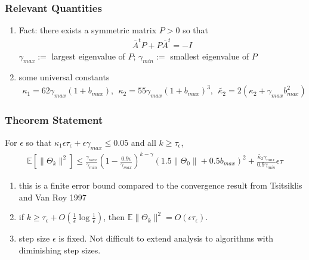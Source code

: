 \documentclass[t,10pt]{beamer}
\newcommand{\E}{\mathbb{E}}
\theoremstyle{remark}
\begin{document}
\begin{frame}
\frametitle{Relevant Quantities}
\begin{enumerate}
\item Fact: there exists a symmetric matrix $P>0$ so that 
\begin{align}
\overline{A}^tP + P\overline{A}^t = -I
\end{align}
$\gamma_{max}:=$ largest eigenvalue of $P$; $\gamma_{min}:=$ smallest eigenvalue of $P$
\item some universal constants
\begin{align}
\kappa_1= 62\gamma_{max}(1+b_{max}), \ \ \kappa_2 = 55\gamma_{max}(1+b_{max})^3, \ \ \tilde{\kappa_2} = 2(\kappa_2+\gamma_{max}b^2_{max})
\end{align}
\end{enumerate}
\end{frame}







\begin{frame}
\frametitle{Theorem Statement}
\begin{theorem}
For $\epsilon$ so that $\kappa_1 \epsilon \tau_\epsilon + \epsilon \gamma_{max} \leq 0.05$ and all $k \geq \tau_\epsilon$,
\begin{align}
\E[ \|\Theta_k\|^2] \leq \frac{\gamma_{max}}{\gamma_{min}}\left(1-\frac{0.9\epsilon}{\gamma_{max}}\right)^{k-\gamma} (1.5\|\Theta_0\|+0.5 b_{max})^2 + \frac{\tilde{\kappa_2} \gamma_{max}}{0.9\gamma_{min}} \epsilon \tau
\end{align}
\end{theorem}
\begin{enumerate}
\item this is a finite error bound compared to the convergence result from Tsitsiklis and Van Roy 1997
\item if $k \geq \tau_\epsilon + O(\frac{1}{\epsilon}\log\frac{1}{\epsilon})$, then $\E\|\Theta_k\|^2 = O(\epsilon \tau_\epsilon)$. 
\item step size $\epsilon$ is fixed. Not difficult to extend analysis to algorithms with diminishing step sizes.
\end{enumerate}
\end{frame}
\end{document}
